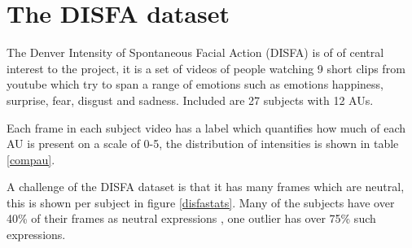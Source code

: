 





    \section{The DISFA dataset} \label{disfa_list}
    The Denver Intensity of Spontaneous Facial Action (DISFA)\cite{disfa} is of
    of central interest to the project, it is a set
    of videos of people watching 9 short clips from youtube which try to span a range
    of emotions such as emotions happiness, surprise, fear, disgust and sadness. Included
    are 27 subjects with 12 AUs.

    Each frame in each subject video has a label which quantifies how much of each
    AU is present on a scale of 0-5, the distribution of intensities is shown in table \ref{compau}.

    A challenge of the DISFA dataset is that it has many frames which are neutral, this is shown
    per subject in figure \ref{disfastats}. Many of the subjects have over 40\% of their frames as neutral expressions
    , one outlier has over 75\% such expressions.

